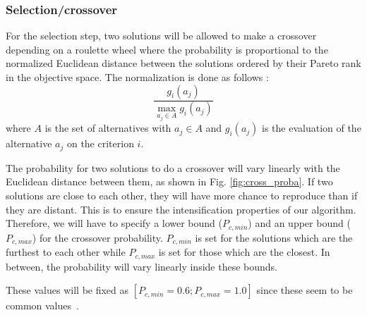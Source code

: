 \subsubsection*{Selection/crossover}
For the selection step, two solutions will be allowed to make a crossover depending on a roulette wheel where the probability is proportional to the normalized Euclidean distance between the solutions ordered by their Pareto rank in the objective space. The normalization is done as follows :
\begin{equation}
\frac{g_i(a_j)}{\max\limits_{a_j \in A} g_i(a_j)}
\end{equation}
where $A$ is the set of alternatives with $a_j \in A$ and $g_i(a_j)$ is the evaluation of the alternative $a_j$ on the criterion $i$.


The probability for two solutions to do a crossover will vary linearly with the Euclidean distance between them, as shown in Fig. \ref{fig:cross_proba}. If two solutions are close to each other, they will have more chance to reproduce than if they are distant. This is to ensure the intensification properties of our algorithm. Therefore, we will have to specify a lower bound ($P_{c, min}$) and an upper bound ($P_{c, max}$) for the crossover probability. $P_{c, min}$ is set for the solutions which are the furthest to each other while $P_{c, max}$ is set for those which are the closest. In between, the probability will vary linearly inside these bounds.

These values will be fixed as $[P_{c, min} = 0.6; P_{c, max} = 1.0]$ since these seem to be common values~\cite{Davis1989}.

